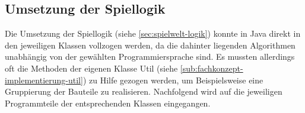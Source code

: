 \subsection{Umsetzung der Spiellogik}
\label{sub:fachkonzept-implementierung-spiellogik}


Die Umsetzung der Spiellogik (siehe \ref{sec:spielwelt-logik}) konnte in Java direkt in den jeweiligen Klassen vollzogen werden, da die dahinter liegenden Algorithmen unabhängig von der gewählten Programmiersprache sind. Es mussten allerdings oft die Methoden der eigenen Klasse Util (siehe \ref{sub:fachkonzept-implementierung-util}) zu Hilfe gezogen werden, um Beispielsweise eine Gruppierung der Bauteile zu realisieren. Nachfolgend wird auf die jeweiligen Programmteile der entsprechenden Klassen eingegangen.









\autorende{}